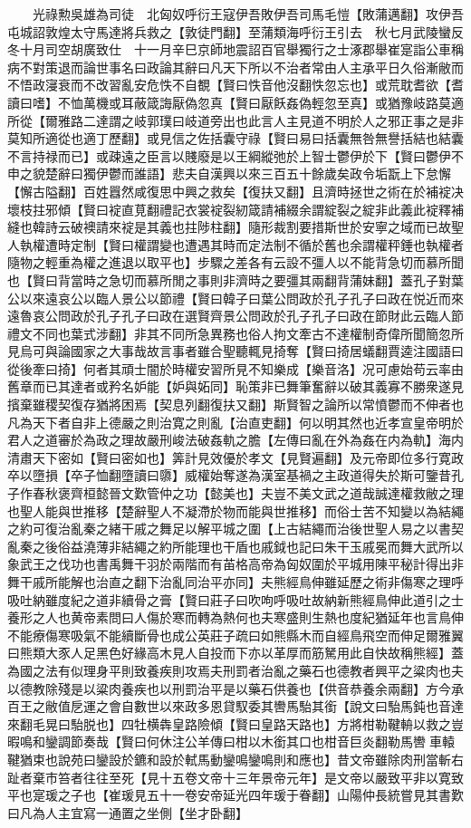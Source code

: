 　　光祿勲吳雄為司徒　北匈奴呼衍王寇伊吾敗伊吾司馬毛愷【敗蒲邁翻】攻伊吾屯城詔敦煌太守馬達將兵救之【敦徒門翻】至蒲類海呼衍王引去　秋七月武陵蠻反冬十月司空胡廣致仕　十一月辛巳京師地震詔百官舉獨行之士涿郡舉崔寔詣公車稱病不對策退而論世事名曰政論其辭曰凡天下所以不治者常由人主承平日久俗漸敝而不悟政寖衰而不改習亂安危怢不自覩【賢曰怢音他沒翻怢忽忘也】或荒耽耆欲【耆讀曰嗜】不恤萬機或耳蔽箴誨厭偽忽真【賢曰厭飫姦偽輕忽至真】或猶豫岐路莫適所從【爾雅路二達謂之岐郭璞曰岐道旁出也此言人主見道不明於人之邪正事之是非莫知所適從也適丁歷翻】或見信之佐括囊守祿【賢曰易曰括囊無咎無譽括結也結囊不言持禄而已】或疎遠之臣言以賤廢是以王綱縱弛於上智士鬱伊於下【賢曰鬱伊不申之貌楚辭曰獨伊鬱而誰語】悲夫自漢興以來三百五十餘歲矣政令垢翫上下怠懈【懈古隘翻】百姓囂然咸復思中興之救矣【復扶又翻】且濟時拯世之術在於補䘺决壞枝拄邪傾【賢曰䘺直莧翻禮記衣裳䘺裂紉箴請補綴余謂綻裂之綻非此義此䘺釋補縫也韓詩云破襖請來䘺是其義也拄陟柱翻】隨形裁割要措斯世於安寧之域而已故聖人執權遭時定制【賢曰權謂變也遭遇其時而定法制不循於舊也余謂權秤錘也執權者隨物之輕重為權之進退以取平也】步驟之差各有云設不彊人以不能背急切而慕所聞也【賢曰背當時之急切而慕所閒之事則非濟時之要彊其兩翻背蒲妹翻】蓋孔子對葉公以來遠哀公以臨人景公以節禮【賢曰韓子曰葉公問政於孔子孔子曰政在悦近而來遠魯哀公問政於孔子孔子曰政在選賢齊景公問政於孔子孔子曰政在節財此云臨人節禮文不同也葉式涉翻】非其不同所急異務也俗人拘文牽古不達權制奇偉所聞簡忽所見烏可與論國家之大事哉故言事者雖合聖聽輒見掎奪【賢曰掎居蟻翻賈逵注國語曰從後牽曰掎】何者其頑士闇於時權安習所見不知樂成【樂音洛】况可慮始苟云率由舊章而已其達者或矜名妒能【妒與妬同】恥策非已舞筆奮辭以破其義寡不勝衆遂見擯棄雖稷契復存猶將困焉【契息列翻復扶又翻】斯賢智之論所以常憤鬱而不伸者也凡為天下者自非上德嚴之則治寛之則亂【治直吏翻】何以明其然也近孝宣皇帝明於君人之道審於為政之理故嚴刑峻法破姦軌之膽【左傳曰亂在外為姦在内為軌】海内清肅天下密如【賢曰密如也】筭計見效優於孝文【見賢遍翻】及元帝即位多行寛政卒以墮損【卒子恤翻墮讀曰隳】威權始奪遂為漢室基禍之主政道得失於斯可鑒昔孔子作春秋褒齊桓懿晉文歎管仲之功【懿美也】夫豈不美文武之道哉誠達權救敝之理也聖人能與世推移【楚辭聖人不凝滯於物而能與世推移】而俗士苦不知變以為結繩之約可復治亂秦之緒干戚之舞足以解平城之圍【上古結繩而治後世聖人易之以書契亂秦之後俗益澆薄非結繩之約所能理也干盾也戚鉞也記曰朱干玉戚冕而舞大武所以象武王之伐功也書禹舞干羽於兩階而有苖格高帝為匈奴圍於平城用陳平秘計得出非舞干戚所能解也治直之翻下治亂同治平亦同】夫熊經鳥伸雖延歷之術非傷寒之理呼吸吐納雖度紀之道非續骨之膏【賢曰莊子曰吹呴呼吸吐故納新熊經鳥伸此道引之士養形之人也黄帝素問曰人傷於寒而轉為熱何也夫寒盛則生熱也度紀猶延年也言鳥伸不能療傷寒吸氣不能續斷骨也成公英莊子疏曰如熊縣木而自經鳥飛空而伸足爾雅翼曰熊類大豕人足黑色好緣高木見人自投而下亦以革厚而筋駑用此自快故稱熊經】蓋為國之法有似理身平則致養疾則攻焉夫刑罰者治亂之藥石也德教者興平之粱肉也夫以德教除殘是以粱肉養疾也以刑罰治平是以藥石供養也【供音恭養余兩翻】方今承百王之敝值戹運之會自數世以來政多恩貸馭委其轡馬駘其銜【說文曰駘馬鈍也音達來翻毛晃曰駘脱也】四牡横犇皇路險傾【賢曰皇路天路也】方將柑勒鞬輈以救之豈暇鳴和鑾調節奏哉【賢曰何休注公羊傳曰柑以木銜其口也柑音巨炎翻勒馬轡車轅鞬猶束也說苑曰鑾設於鑣和設於軾馬動鑾鳴鑾鳴則和應也】昔文帝雖除肉刑當斬右趾者棄市笞者往往至死【見十五卷文帝十三年景帝元年】是文帝以嚴致平非以寛致平也寔瑗之子也【崔瑗見五十一卷安帝延光四年瑗于眷翻】山陽仲長統嘗見其書歎曰凡為人主宜寫一通置之坐側【坐才卧翻】


